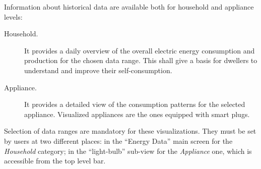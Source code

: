 % 
Information about historical data are available both for household and appliance levels:
\begin{description}
 \item[Household.] It provides a daily overview of the overall electric energy consumption and production for the chosen data range. This shall give a basis for dwellers to understand and improve their self-consumption.
 \item[Appliance.] It provides a detailed view of the consumption patterns for the selected appliance. Visualized appliances are the ones equipped with smart plugs. 
\end{description}
Selection of data ranges are mandatory for these visualizations. They must be set by users at two different places: in the ``Energy Data'' main screen for the \textit{Household} category;
in the ``light-bulb'' sub-view for the \textit{Appliance} one, which is accessible from the top level bar.


